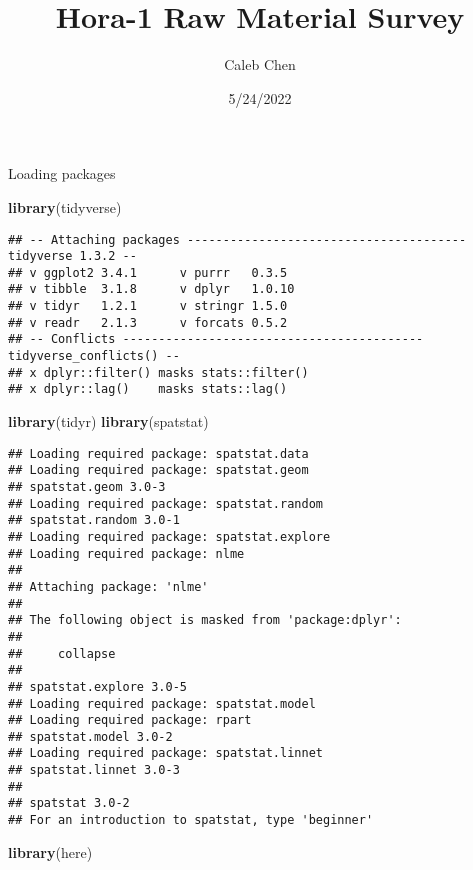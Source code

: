 \documentclass[
]{article}
\title{Hora-1 Raw Material Survey}
\author{Caleb Chen}
\date{5/24/2022}
\newenvironment{Shaded}{\begin{snugshade}}{\end{snugshade}}
\newcommand{\FunctionTok}[1]{\textcolor[rgb]{0.13,0.29,0.53}{\textbf{#1}}}
\newcommand{\NormalTok}[1]{#1}
\begin{document}
\maketitle

Loading packages

\begin{Shaded}
\begin{Highlighting}[]
\FunctionTok{library}\NormalTok{(tidyverse)}
\end{Highlighting}
\end{Shaded}

\begin{verbatim}
## -- Attaching packages --------------------------------------- tidyverse 1.3.2 --
## v ggplot2 3.4.1      v purrr   0.3.5 
## v tibble  3.1.8      v dplyr   1.0.10
## v tidyr   1.2.1      v stringr 1.5.0 
## v readr   2.1.3      v forcats 0.5.2 
## -- Conflicts ------------------------------------------ tidyverse_conflicts() --
## x dplyr::filter() masks stats::filter()
## x dplyr::lag()    masks stats::lag()
\end{verbatim}

\begin{Shaded}
\begin{Highlighting}[]
\FunctionTok{library}\NormalTok{(tidyr)}
\FunctionTok{library}\NormalTok{(spatstat)}
\end{Highlighting}
\end{Shaded}

\begin{verbatim}
## Loading required package: spatstat.data
## Loading required package: spatstat.geom
## spatstat.geom 3.0-3
## Loading required package: spatstat.random
## spatstat.random 3.0-1
## Loading required package: spatstat.explore
## Loading required package: nlme
## 
## Attaching package: 'nlme'
## 
## The following object is masked from 'package:dplyr':
## 
##     collapse
## 
## spatstat.explore 3.0-5
## Loading required package: spatstat.model
## Loading required package: rpart
## spatstat.model 3.0-2
## Loading required package: spatstat.linnet
## spatstat.linnet 3.0-3
## 
## spatstat 3.0-2 
## For an introduction to spatstat, type 'beginner'
\end{verbatim}

\begin{Shaded}
\begin{Highlighting}[]
\FunctionTok{library}\NormalTok{(here)}
\end{Highlighting}
\end{Shaded}
\end{document}
